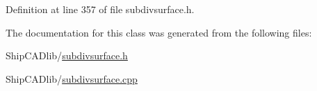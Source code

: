 Definition at line 357 of file subdivsurface.\-h.



The documentation for this class was generated from the following files\-:\begin{DoxyCompactItemize}
\item 
Ship\-C\-A\-Dlib/\hyperlink{subdivsurface_8h}{subdivsurface.\-h}\item 
Ship\-C\-A\-Dlib/\hyperlink{subdivsurface_8cpp}{subdivsurface.\-cpp}\end{DoxyCompactItemize}
